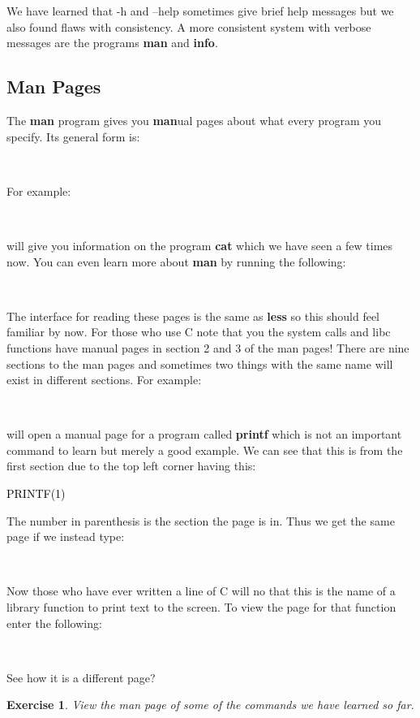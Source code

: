 \documentclass{book}
\newcommand{\commandline}[1]{\begin{center} \colorbox{Dark}{\textcolor{white}{#1}} \end{center}}
\newcommand{\exampleout}[1]{\begin{center} \colorbox{Light}{\textcolor{black}{#1}} \end{center}}
\newtheorem{ex}{Exercise}[chapter]
\begin{document}
We have learned that -h and --help sometimes give brief help messages but we also found flaws with consistency. A more consistent system with verbose messages are the programs \textbf{man} and \textbf{info}.
\subsection{Man Pages}
The \textbf{man} program gives you \textbf{man}ual pages about what every program you specify. Its general form is:
\commandline{man programname}
For example:
\commandline{man cat}
will give you information on the program \textbf{cat} which we have seen a few times now. You can even learn more about \textbf{man} by running the following:
\commandline{man}
The interface for reading these pages is the same as \textbf{less} so this should feel familiar by now. For those who use C note that you the system calls and libc functions have manual pages in section 2 and 3 of the man pages! 
There are nine sections to the man pages and sometimes two things with the same name will exist in different sections. For example:
\commandline{man printf}
will open a manual page for a program called \textbf{printf} which is not an important command to learn but merely a good example. We can see that this is from the first section due to the top left corner having this:
\exampleout{PRINTF(1)}
The number in parenthesis is the section the page is in. Thus we get the same page if we instead type:
\commandline{man 1 printf}
Now those who have ever written a line of C will no that this is the name of a library function to print text to the screen. To view the page for that function enter the following:
\commandline{man 3 printf}
See how it is a different page?
\begin{ex}
	View the man page of some of the commands we have learned so far.
\end{ex}
\end{document}

